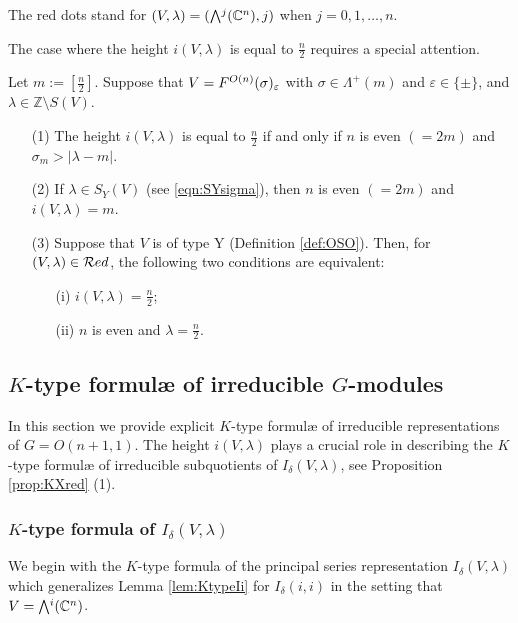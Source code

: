 \begin{example}
The red dots stand for 
 $(V,\lambda)=(\Exterior^j({\mathbb{C}}^n), j)$ 
 when $j=0,1,\ldots,n$. 
\end{example}



The case 
 where the height $i(V,\lambda)$ is equal to $\frac n 2$
 requires a special attention. 
\begin{lemma}
\label{lem:isig}
Let $m:=[\frac n 2]$.  
Suppose that $V =F^{{O(n)}}({\sigma})_{\varepsilon}$ 
 with $\sigma \in \Lambda^+(m)$
 and $\varepsilon \in \{\pm\}$, 
 and $\lambda \in {\mathbb{Z}} \setminus S(V)$.  
\begin{enumerate}
\item[{\rm{(1)}}]
The height $i(V, \lambda)$ is equal to $\frac n 2$
 if and only if $n$ is even
 $(=2m)$
 and $\sigma_{m} > |\lambda -m|$.  
\item[{\rm{(2)}}]
If $\lambda \in S_Y(V)$
 (see \eqref{eqn:SYsigma}), 
 then $n$ is even $(=2m)$
 and $i(V, \lambda)=m$.  
\item[{\rm{(3)}}]
Suppose that $V$ is of type Y
 (Definition \ref{def:OSO}).  
Then,  
 for $(V, \lambda) \in {\mathcal{R}}ed$, 
 the following two conditions are equivalent:
\begin{enumerate}
\item[{\rm{(i)}}]
$i(V,\lambda) = \frac n 2$;
\item[{\rm{(ii)}}]
$n$ is even 
 and $\lambda = \frac n 2$.  
\end{enumerate}
\end{enumerate}
\end{lemma}


\subsection{$K$-type formul{\ae} of irreducible $G$-modules
\label{subsec:Ktypes}}

In this section we provide explicit $K$-type formul{\ae}
 of irreducible representations of $G=O(n+1,1)$.  
The height $i(V,\lambda)$ plays a crucial role
 in describing the $K$-type formul{\ae}
 of irreducible subquotients
 of $I_{\delta}(V, \lambda)$, 
 see Proposition \ref{prop:KXred} (1).  

\subsubsection{$K$-type formula of $I_{\delta}(V, \lambda)$}
We begin with the $K$-type formula
 of the principal series representation
 $I_{\delta}(V, \lambda)$
 which generalizes Lemma \ref{lem:KtypeIi}
 for $I_{\delta}(i,i)$ 
 in the setting that $V=\Exterior^i({\mathbb{C}}^n)$.  

